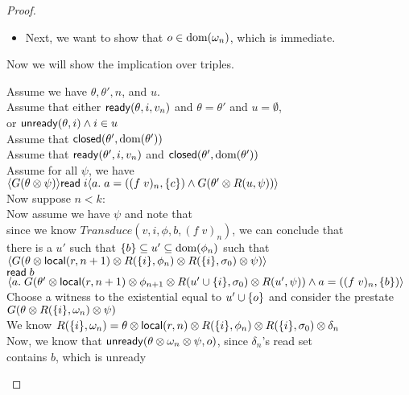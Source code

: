 \begin{proof}
\begin{itemize}
\item Next, we want to show that $o \in \mbox{dom}({\omega_n})$, which is immediate. 
\end{itemize}

Now we will show the implication over triples. 
\begin{tabbedproof}
\oo Assume we have $\theta, \theta', n$, and $u$. \\
\oo Assume that either $\mathsf{ready}({\theta}, {i}, {v_n})$ and $\theta = \theta'$ and $u = \emptyset$,  \\
\oo or $\mathsf{unready}({\theta}, {i}) \land i \in u$ \\
\oo Assume that $\mathsf{closed}({\theta'}, {\mbox{dom}({\theta'})})$ \\
\oo Assume that $\mathsf{ready}({\theta'}, {i}, {v_n})$ and $\mathsf{closed}({\theta'}, {\mbox{dom}({\theta'})})$ \\
\oo Assume for all $\psi$, we have \\
\ox  $\langle{G(\theta \otimes \psi)}\rangle{\mathsf{read}\;i}\langle{a}.\;{a = ((f\;v)_n, \{{c}\}) 
      \land G(\theta' \otimes R(u,\psi)) }\rangle$ \\
\oo Now suppose $n < k$: \\
\ooo Now assume we have $\psi$ and note that  \\
\oooo since we know $\mathit{Transduce}(v, i, \phi, b, (f\;v)_n)$, we can conclude that \\
\oooo there is a $u'$ such that $\{{b}\} \subseteq u' \subseteq \mbox{dom}({\phi_n})$ such that \\
\oooo $\left<G(\theta \otimes \mathsf{local}({r}, {n+1}) \otimes R(\{{i}\}, \phi_n) \otimes R(\{{i}\}, \sigma_0) \otimes \psi)\right>$ \\
\oooo $\mathsf{read}\; b$\\
\oooo $\left<a.\;G(\theta' \otimes \mathsf{local}({r}, {n+1}) \otimes \phi_{n+1} \otimes R(u' \cup \{{i}\}, \sigma_0) \otimes R(u', \psi))
      \land a = ((f\;v)_n, \{{b}\})\right>$ \\
\ooo Choose a witness to the existential equal to $u' \cup \{{o}\}$ and consider the prestate \\
\ooo $G(\theta \otimes R(\{{i}\}, \omega_n) \otimes \psi)$ \\
\ooo We know $R(\{{i}\}, \omega_n) = \theta \otimes \mathsf{local}({r}, {n}) \otimes R(\{{i}\}, \phi_n) \otimes R(\{{i}\}, \sigma_0) \otimes \delta_n$ \\
\ooo Now, we know that $\mathsf{unready}({\theta \otimes \omega_n \otimes \psi}, {o})$, since $\delta_n$'s read set \\
\ooo contains $b$, which is unready \\

\end{tabbedproof}
\end{proof}
